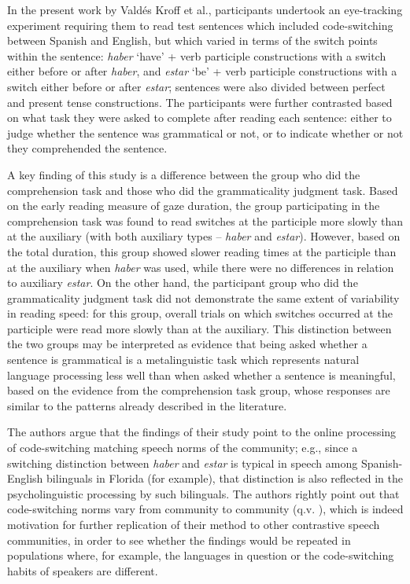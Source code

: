 \documentclass[output=paper]{langscibook}
\begin{document}
In the present work by Valdés Kroff et al., participants undertook an eye-tracking experiment requiring them to read test sentences which included code-switching between Spanish and English, but which varied in terms of the switch points within the sentence: \textit{haber} ‘have’ + verb participle constructions with a switch either before or after \textit{haber}, and \textit{estar} ‘be’ + verb participle constructions with a switch either before or after \textit{estar}; sentences were also divided between perfect and present tense constructions. The participants were further contrasted based on what task they were asked to complete after reading each sentence: either to judge whether the sentence was grammatical or not, or to indicate whether or not they comprehended the sentence.

A key finding of this study is a difference between the group who did the comprehension task and those who did the grammaticality judgment task. Based on the early reading measure of gaze duration, the group participating in the comprehension task was found to read switches at the participle more slowly than at the auxiliary (with both auxiliary types -- \textit{haber} and \textit{estar}). However, based on the total duration, this group showed slower reading times at the participle than at the auxiliary when \textit{haber} was used, while there were no differences in relation to auxiliary \textit{estar}. On the other hand, the participant group who did the grammaticality judgment task did not demonstrate the same extent of variability in reading speed: for this group, overall trials on which switches occurred at the participle were read more slowly than at the auxiliary. This distinction between the two groups may be interpreted as evidence that being asked whether a sentence is grammatical is a metalinguistic task which represents natural language processing less well than when asked whether a sentence is meaningful, based on the evidence from the comprehension task group, whose responses are similar to the patterns already described in the literature.

The authors argue that the findings of their study point to the online processing of code-switching matching speech norms of the community; e.g., since a switching distinction between \textit{haber} and \textit{estar} is typical in speech among Spanish-English bilinguals in Florida (for example), that distinction is also reflected in the psycholinguistic processing by such bilinguals. The authors rightly point out that code-switching norms vary from community to community (q.v. \citealt{ParafitaCouto2017, CarterEtAl2011, Deuchar2020}), which is indeed motivation for further replication of their method to other contrastive speech communities, in order to see whether the findings would be repeated in populations where, for example, the languages in question or the code-switching habits of speakers are different.
\end{document}
